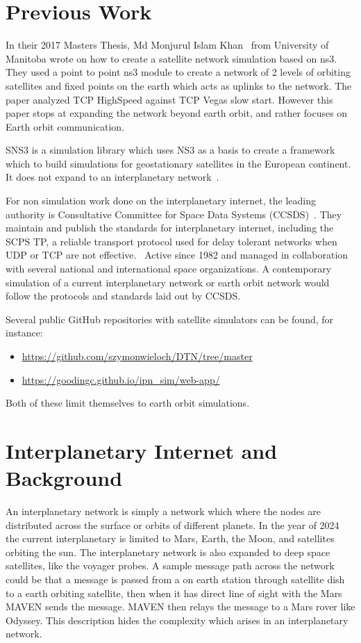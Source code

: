 \documentclass[a4paper,12pt]{article}
\begin{document}
\section{Previous Work}

In their 2017 Masters Thesis, Md Monjurul Islam Khan~\cite{Khan2017} from
University of Manitoba wrote on how to create a satellite network simulation
based on ns3. They used a point to point ns3 module to create a network of 2
levels of orbiting satellites and fixed points on the earth which acts as
uplinks to the network. The paper analyzed TCP HighSpeed against TCP Vegas slow
start. However this paper stops at expanding the network beyond earth orbit, and
rather focuses on Earth orbit communication.

SNS3 is a simulation library which uses NS3 as a basis to create a framework
which to build simulations for geostationary satellites in the European
continent. It does not expand to an interplanetary network~\cite{Puttonen2014}.

For non simulation work done on the interplanetary internet, the leading
authority is Consultative Committee for Space Data Systems
(CCSDS)~\cite{CCSDS.org}. They maintain and publish the standards for
interplanetary internet, including the SCPS TP, a reliable transport protocol
used for delay tolerant networks when UDP or TCP are not
effective.~\cite{Keith2004} Active since 1982 and managed in collaboration with
several national and international space organizations. A contemporary
simulation of a current interplanetary network or earth orbit network would
follow the protocols and standards laid out by CCSDS.

Several public GitHub repositories with satellite simulators can be
found, for instance:
\begin{itemize}
\item\url{https://github.com/szymonwieloch/DTN/tree/master}
\item\url{https://goodingc.github.io/ipn_sim/web-app/}
\end{itemize}
Both of these limit themselves to earth orbit simulations.

\section{Interplanetary Internet and Background}

An interplanetary network is simply a network which where the nodes are
distributed across the surface or orbits of different planets. In the year of
2024 the current interplanetary is limited to Mars, Earth, the Moon, and
satellites orbiting the sun. The interplanetary network is also expanded to deep
space satellites, like the voyager probes. A sample message path across the
network could be that a message is passed from a on earth station through
satellite dish to a earth orbiting satellite, then when it has direct line of
sight with the Mars MAVEN sends the message. MAVEN then relays the message to a
Mars rover like Odyssey. This description hides the complexity which arises in
an interplanetary network.
\end{document}
